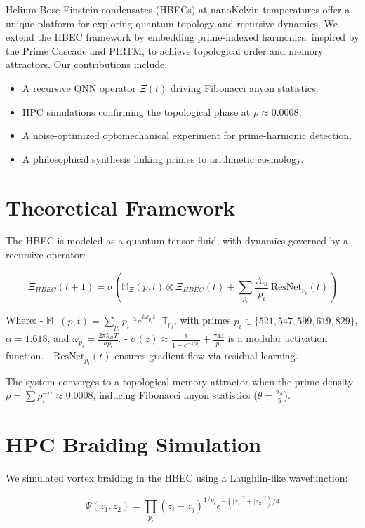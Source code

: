 \documentclass{article}
\theoremstyle{plain}
\begin{document}
Helium Bose-Einstein condensates (HBECs) at nanoKelvin temperatures offer a unique platform for exploring quantum topology and recursive dynamics. We extend the HBEC framework by embedding prime-indexed harmonics, inspired by the Prime Cascade and PIRTM, to achieve topological order and memory attractors. Our contributions include:

\begin{itemize}
    \item A recursive QNN operator \(\Xi(t)\) driving Fibonacci anyon statistics.
    \item HPC simulations confirming the topological phase at \(\rho \approx 0.0008\).
    \item A noise-optimized optomechanical experiment for prime-harmonic detection.
    \item A philosophical synthesis linking primes to arithmetic cosmology.
\end{itemize}

\section{Theoretical Framework}
The HBEC is modeled as a quantum tensor fluid, with dynamics governed by a recursive operator:

\[
\Xi_{HBEC}(t+1) = \sigma\left( \mathbb{M}_{\Xi}(p, t) \otimes \Xi_{HBEC}(t) + \sum_{p_i} \frac{\Lambda_m}{p_i} \, \text{ResNet}_{p_i}(t) \right)
\]

Where:
- \(\mathbb{M}_{\Xi}(p, t) = \sum_{p_i} p_i^{-\alpha} e^{i \omega_{p_i} t} \cdot \mathbb{T}_{p_i}\), with primes \(p_i \in \{521, 547, 599, 619, 829\}\), \(\alpha = 1.618\), and \(\omega_{p_i} = \frac{2\pi k_B T}{h p_i}\).
- \(\sigma(z) \approx \frac{1}{1 + e^{-z/p_i}} + \frac{744}{p_i}\) is a modular activation function.
- \(\text{ResNet}_{p_i}(t)\) ensures gradient flow via residual learning.

The system converges to a topological memory attractor when the prime density \(\rho = \sum p_i^{-\alpha} \approx 0.0008\), inducing Fibonacci anyon statistics (\(\theta = \frac{2\pi}{5}\)).

\section{HPC Braiding Simulation}
We simulated vortex braiding in the HBEC using a Laughlin-like wavefunction:

\[
\Psi(z_1, z_2) = \prod_{p_i} (z_i - z_j)^{1/p_i} e^{-(|z_1|^2 + |z_2|^2)/4}
\]
\end{document}

